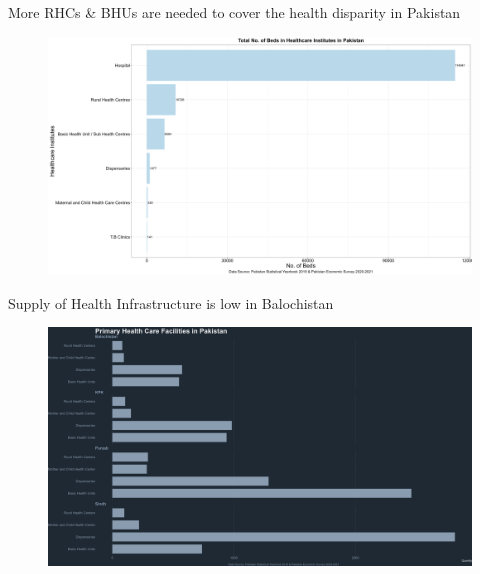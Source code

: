 \documentclass[
  ignorenonframetext,
]{beamer}
\begin{document}
\begin{frame}{More RHCs \& BHUs are needed to cover the health disparity
in Pakistan}
\protect\hypertarget{more-rhcs-bhus-are-needed-to-cover-the-health-disparity-in-pakistan}{}
\begin{figure}

{\centering \includegraphics{beds.png}

}

\end{figure}
\end{frame}

\begin{frame}{Supply of Health Infrastructure is low in Balochistan}
\protect\hypertarget{supply-of-health-infrastructure-is-low-in-balochistan}{}
\begin{figure}

{\centering \includegraphics{primary_health_facilities.png}

}

\end{figure}
\end{frame}
\end{document}
